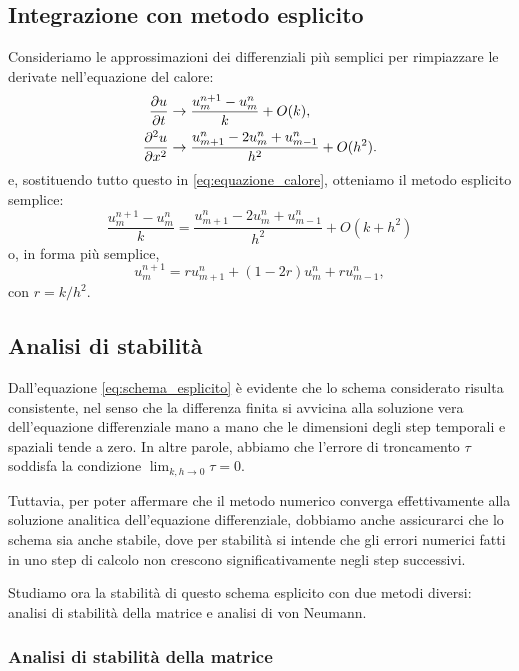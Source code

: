\documentclass[10pt,a4paper]{article}
\begin{document}
\subsection{Integrazione con metodo esplicito}

Consideriamo le approssimazioni dei differenziali più semplici per rimpiazzare le derivate nell'equazione del calore:
\begin{align}
	\pdv{u}{t} &\to \frac{u_m^{n+1} - u_m^n}{k} + O(k),\\
	\pdv[2]{u}{x} &\to \frac{u_{m+1}^n-2u_m^n + u_{m-1}^n}{h^2} + O(h^2).
\end{align}
e, sostituendo tutto questo in \eqref{eq:equazione_calore}, otteniamo il metodo esplicito semplice:
\begin{equation}
	\frac{u_m^{n+1} - u_m^n}{k} = \frac{u_{m+1}^n-2u_m^n + u_{m-1}^n}{h^2} + O(k + h^2) 
	\label{eq:schema_esplicito}
\end{equation}
o, in forma più semplice,
\begin{equation}
	u_m^{n+1} = ru_{m+1}^n + (1-2r)u_m^n + ru_{m-1}^n,
	\label{eq:schema_esplicito_completo}
\end{equation}
con $r = k/h^2$.

\subsection{Analisi di stabilità}

Dall'equazione \eqref{eq:schema_esplicito} è evidente che lo schema considerato risulta consistente, nel senso che la differenza finita si avvicina alla soluzione vera dell'equazione differenziale mano a mano che le dimensioni degli step temporali e spaziali tende a zero. In altre parole, abbiamo che l'errore di troncamento $\tau$ soddisfa la condizione $\lim_{k,h\to 0}\tau = 0$.

Tuttavia, per poter affermare che il metodo numerico converga effettivamente alla soluzione analitica dell'equazione differenziale, dobbiamo anche assicurarci che lo schema sia anche stabile, dove per stabilità si intende che gli errori numerici fatti in uno step di calcolo non crescono significativamente negli step successivi.

Studiamo ora la stabilità di questo schema esplicito con due metodi diversi: analisi di stabilità della matrice e analisi di von Neumann.

\subsubsection{Analisi di stabilità della matrice}
\end{document}
